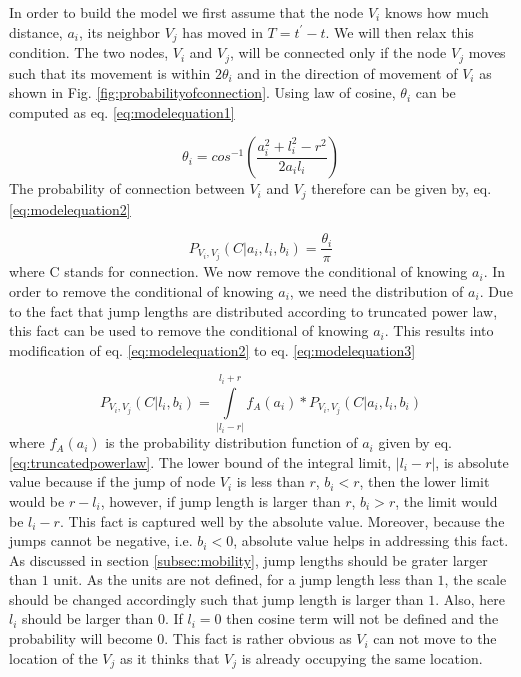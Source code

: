 \documentclass[preprint, twocolumn,5p]{elsarticle}
\begin{document}
In order to build the model we first assume that the node $V_{i}$ knows how much distance, $a_{i}$, its neighbor $V_{j}$ has moved in $T=t^{'}-t$. We will then relax this condition. The two nodes, $V_{i}$ and $V_{j}$, will be connected only if the node $V_{j}$ moves such that its movement is within $2\theta_{i}$ and in the direction of movement of $V_{i}$ as shown in Fig. \ref{fig:probabilityofconnection}. Using law of cosine, $\theta_{i}$ can be computed as eq. \ref{eq:modelequation1}

\begin {equation}\label{eq:modelequation1}
\theta_{i}=cos^{-1}\left(\frac{a_{i}^{2}+l_{i}^{2}-r^{2}}{2a_{i}l_{i}} \right)
\end{equation}
The probability of connection between $V_{i}$ and $V_{j}$ therefore can be given by, eq.\ref{eq:modelequation2}

\begin {equation}\label{eq:modelequation2}
P_{V_{i},V_{j}}(C|a_{i},l_{i},b_{i})=\frac{\theta_{i}}{\pi}
\end{equation}
where C stands for connection. We now remove the conditional of knowing $a_{i}$. In order to remove the conditional of knowing $a_{i}$, we need the distribution of $a_{i}$. Due to the fact that jump lengths are distributed according to truncated power law, this fact can be used to remove the conditional of knowing $a_{i}$. This results into modification of eq. \ref{eq:modelequation2} to eq. \ref{eq:modelequation3}

\begin {equation}\label{eq:modelequation3}
P_{V_{i},V_{j}}(C|l_{i},b_{i})=\int \limits _{|l_{i}-r|}^{l_{i}+r} f_{A}(a_{i})*P_{V_{i},V_{j}}(C|a_{i},l_{i},b_{i})
\end{equation}
where $f_{A}(a_{i})$ is the probability distribution function of $a_{i}$ given by eq. \ref{eq:truncatedpowerlaw}. The lower bound of the integral limit, $|l_{i}-r|$, is absolute value because if the jump of node $V_{i}$ is less than $r$, $b_{i}<r$, then the lower limit would be $r-l_{i}$, however, if jump length is larger than $r$, $b_{i}>r$, the limit would be $l_{i}-r$. This fact is captured well by the absolute value. Moreover, because the jumps cannot be negative, i.e. $b_{i}<0$, absolute value helps in addressing this fact. As discussed in section \ref{subsec:mobility}, jump lengths should be grater larger than $1$ unit. As the units are not defined, for a jump length less than $1$, the scale should be changed accordingly such that jump length is larger than $1$. Also, here $l_{i}$ should be larger than $0$. If $l_{i}=0$ then cosine term will not be defined and the probability will become 0. This fact is rather obvious as $V_{i}$ can not move to the location of the $V_{j}$ as it thinks that $V_{j}$ is already occupying the same location.
\end{document}
